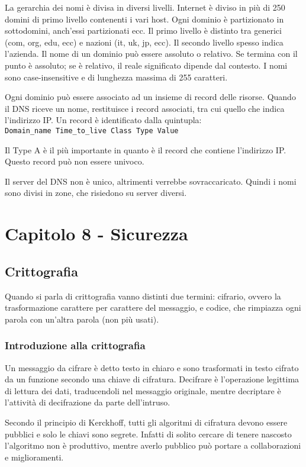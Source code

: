 La gerarchia dei nomi è divisa in diversi livelli. 
Internet è diviso in più di 250 domini di primo livello contenenti i vari host. 
Ogni dominio è partizionato in sottodomini, anch'essi partizionati ecc.
Il primo livello è distinto tra generici (com, org, edu, ecc) e nazioni (it, uk, jp, ecc).
Il secondo livello spesso indica l'azienda.
Il nome di un dominio può essere assoluto o relativo.
Se termina con il punto è assoluto; se è relativo, il reale significato dipende dal contesto.
I nomi sono case-insensitive e di lunghezza massima di 255 caratteri.

Ogni dominio può essere associato ad un insieme di record delle risorse.
Quando il DNS riceve un nome, restituisce i record associati, tra cui quello che indica l'indirizzo IP.
Un record è identificato dalla quintupla:\\
\texttt{Domain\_name Time\_to\_live Class Type Value}

Il Type A è il più importante in quanto è il record che contiene l'indirizzo IP. Questo record può non essere univoco.

Il server del DNS non è unico, altrimenti verrebbe sovraccaricato. Quindi i nomi sono divisi in zone, che risiedono su server diversi. 

\newpage
\section{Capitolo 8 - Sicurezza}

\subsection{Crittografia} %
Quando si parla di crittografia vanno distinti due termini: cifrario, ovvero la trasformazione carattere per carattere del messaggio, e codice, che rimpiazza ogni parola con un'altra parola (non più usati).

\subsubsection{Introduzione alla crittografia}
Un messaggio da cifrare è detto testo in chiaro e sono trasformati in testo cifrato da un funzione secondo una chiave di cifratura.
Decifrare è l'operazione legittima di lettura dei dati, traducendoli nel messaggio originale, mentre decriptare è l'attività di decifrazione da parte dell'intruso.

Secondo il principio di Kerckhoff, tutti gli algoritmi di cifratura devono essere pubblici e solo le chiavi sono segrete.
Infatti di solito cercare di tenere nascosto l'algoritmo non è produttivo, mentre averlo pubblico può portare a collaborazioni e miglioramenti.

